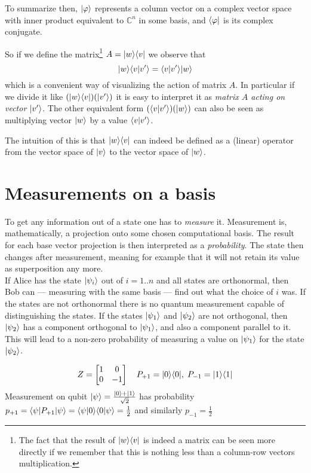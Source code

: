 	To summarize then, $|\varphi \rangle$ represents a column vector on a complex vector space with inner product equivalent to $\mathbb{C}^n$ in some basis, and $\langle \varphi|$ is its complex conjugate.
	
	
	So if we define the matrix\footnote{The fact that the result of  $ |w \rangle\langle v| $ is indeed a matrix can be seen more directly if we remember that this is nothing less than a column-row vectors multiplication.} $A =  |w \rangle\langle v| $ we observe that
	$$ |w \rangle\langle v|v'\rangle = \langle v|v'\rangle|w \rangle $$	
	which is a convenient way of visualizing the action of matrix $A$. In particular if we divide it like $(|w \rangle\langle v|) (|v' \rangle) $ it is easy to interpret it as \textit{matrix $A$ acting on vector $|v' \rangle$}. The other equivalent form $(\langle v|v'\rangle)(|w \rangle)$ can also be seen as multiplying vector $|w \rangle$ by a value $\langle v|v'\rangle$.
	
	The intuition of this is that $|w \rangle\langle v|$ can indeed be defined as a (linear) operator from the vector space of $|v \rangle$ to the vector space of $|w \rangle$. 

\section{Measurements on a  basis} \label{measurements}

	To get any information out of a state one has to \textit{measure} it. 
	Measurement is, mathematically, a projection onto some chosen computational basis. 
	The result for each base vector projection is then interpreted as a \emph{probability}. 
	The state then changes after measurement, meaning for example that it will not retain its value as superposition any more.\\

	If Alice has the state $|\psi_i \rangle$ out of $i=1..n$ and all states are orthonormal, then Bob can --- measuring with the same basis --- find out what the choice of $i$ was.
	If the states are not orthonormal there is no quantum measurement capable of distinguishing the states. 
	If the states $|\psi_1 \rangle$ and $|\psi_2 \rangle$ are not orthogonal, then $|\psi_2 \rangle$ has a component orthogonal to $|\psi_1 \rangle$, and also a component parallel to it.
	This will lead to a non-zero probability of measuring a value on $|\psi_1 \rangle$ for the state $|\psi_2 \rangle$.

	\begin{xmpl}\cite{NC10}
		\begin{equation*} 
			Z = \begin{bmatrix} 1 & 0 \\ 0 & -1 \end{bmatrix} \quad P_{+1} = |0\rangle\langle 0| , \; P_{-1} = |1\rangle\langle 1|
		\end{equation*}
		Measurement on qubit $ |\psi \rangle = \frac{|0 \rangle + |1 \rangle}{\sqrt{2}} $ has probability $p_{+1} = \langle \psi|P_{+1}|\psi \rangle = \langle\psi|0\rangle\langle0|\psi\rangle = \frac{1}{2}$ and similarly $p_{-1} = \frac{1}{2}$
			
	\end{xmpl}
    

